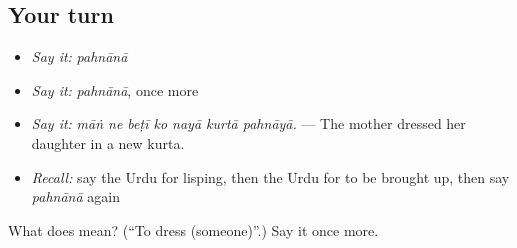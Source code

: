 \subsection*{Your turn}
\begin{itemize}
\raggedright
  \item \emph{Say it:} \emph{pahnānā}
  \item \emph{Say it:} \emph{pahnānā}, once more
  \item \emph{Say it:} \emph{māṅ ne beṭī ko nayā kurtā pahnāyā.} — The mother dressed her daughter in a new kurta.
  \item \emph{Recall:} say the Urdu for lisping, then the Urdu for to be brought up, then say \emph{pahnānā} again
\end{itemize}

\begin{tcolorbox}[breakable,colback=teal!4,colframe=teal!35!black,title={Before you move on}]
What does  mean? (\textquotedblleft{}To dress (someone)\textquotedblright{}.) Say it once more.
\end{tcolorbox}
